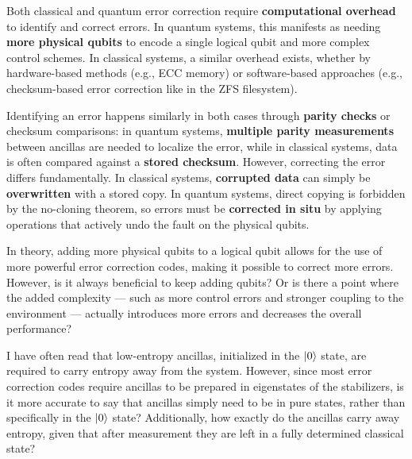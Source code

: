 \documentclass{alex_summary}
\begin{document}
Both classical and quantum error correction require \textbf{computational overhead} to identify and correct errors. In quantum systems, this manifests as needing \textbf{more physical qubits} to encode a single logical qubit and more complex control schemes. In classical systems, a similar overhead exists, whether by hardware-based methods (e.g., ECC memory) or software-based approaches (e.g., checksum-based error correction like in the ZFS filesystem).

Identifying an error happens similarly in both cases through \textbf{parity checks} or checksum comparisons: in quantum systems, \textbf{multiple parity measurements} between ancillas are needed to localize the error, while in classical systems, data is often compared against a \textbf{stored checksum}. However, correcting the error differs fundamentally. In classical systems, \textbf{corrupted data} can simply be \textbf{overwritten} with a stored copy. In quantum systems, direct copying is forbidden by the no-cloning theorem, so errors must be \textbf{corrected in situ} by applying operations that actively undo the fault on the physical qubits.

\begin{question1}
	In theory, adding more physical qubits to a logical qubit allows for the use of more powerful error correction codes, making it possible to correct more errors. However, is it always beneficial to keep adding qubits? Or is there a point where the added complexity — such as more control errors and stronger coupling to the environment — actually introduces more errors and decreases the overall performance?
\end{question1}

\begin{question3}
	 I have often read that low-entropy ancillas, initialized in the $\ket{0}$ state, are required to carry entropy away from the system. However, since most error correction codes require ancillas to be prepared in eigenstates of the stabilizers, is it more accurate to say that ancillas simply need to be in pure states, rather than specifically in the $\ket{0}$ state? Additionally, how exactly do the ancillas carry away entropy, given that after measurement they are left in a fully determined classical state?
\end{question3}

\printbibliography
\end{document}
